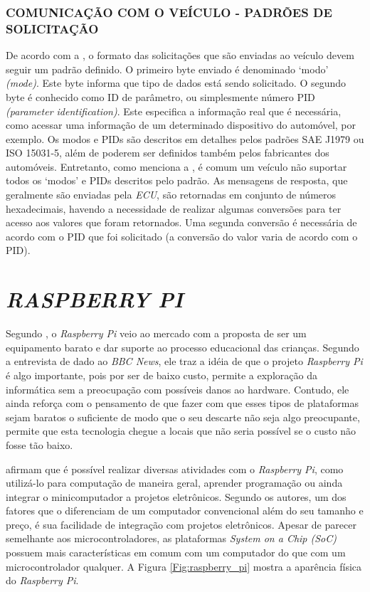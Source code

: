 \subsubsection{COMUNICAÇÃO COM O VEÍCULO - PADRÕES DE SOLICITAÇÃO}
De acordo com a , o formato das solicitações que são enviadas ao veículo devem seguir um padrão definido. O primeiro byte enviado é denominado ‘modo’ \textit{(mode)}. Este byte informa que tipo de dados está sendo solicitado. O segundo byte é conhecido como ID de parâmetro, ou simplesmente número PID \textit{(parameter identification)}. Este especifica a informação real que é necessária, como acessar uma informação de um determinado dispositivo do automóvel, por exemplo. Os modos e PIDs são descritos em detalhes pelos padrões SAE J1979 ou ISO 15031-5, além de poderem ser definidos também pelos fabricantes dos automóveis. Entretanto, como menciona a , é comum um veículo não suportar todos os ‘modos’ e PIDs descritos pelo padrão. As mensagens de resposta, que geralmente são enviadas pela \textit{ECU}, são retornadas em conjunto de números hexadecimais, havendo a necessidade de realizar algumas conversões para ter acesso aos valores que foram retornados. Uma segunda conversão é necessária de acordo com o PID que foi solicitado (a conversão do valor varia de acordo com o PID).

\section{\textit{RASPBERRY PI}}
Segundo , o \textit{Raspberry Pi} veio ao mercado com a proposta de ser um equipamento barato e dar suporte ao processo educacional das crianças. Segundo a entrevista de  dado ao \textit{BBC News}, ele traz a idéia de que o projeto \textit{Raspberry Pi} é algo importante, pois por ser de baixo custo, permite a exploração da informática sem a preocupação com possíveis danos ao hardware. Contudo, ele ainda reforça com o pensamento de que fazer com que esses tipos de plataformas sejam baratos o suficiente de modo que o seu descarte não seja algo preocupante, permite que esta tecnologia chegue a locais que não seria possível se o custo não fosse tão baixo.

 afirmam que é possível realizar diversas atividades com o \textit{Raspberry Pi}, como utilizá-lo para computação de maneira geral, aprender programação ou ainda integrar o minicomputador a projetos eletrônicos. Segundo os autores, um dos fatores que o diferenciam de um computador convencional além do seu tamanho e preço, é sua facilidade de integração com projetos eletrônicos. Apesar de parecer semelhante aos microcontroladores, as plataformas \textit{System on a Chip (SoC)} possuem mais características em comum com um computador do que com um microcontrolador qualquer. A Figura \ref{Fig:raspberry_pi} mostra a aparência física do \textit{Raspberry Pi}.


